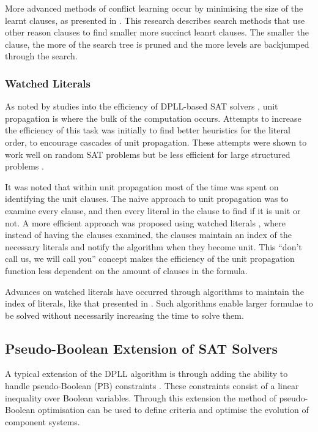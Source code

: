 More advanced methods of conflict learning occur by minimising the size of the learnt clauses, as presented in \citep{sorensson2009}.
This research describes search methods that use other reason clauses to find smaller more succinct leanrt clauses.
The smaller the clause, the more of the search tree is pruned and the more levels are backjumped through the search.

\subsubsection{Watched Literals}
As noted by studies into the efficiency of DPLL-based SAT solvers \citep{dixon2004automating}, unit propagation is where the bulk of the computation occurs.
Attempts to increase the efficiency of this task was initially to find better heuristics \citep{JamesMCrawford1996} for the literal order, to encourage cascades of unit propagation.
These attempts were shown to work well on random SAT problems but be less efficient for large structured problems \citep{dixon2004automating}.

It was noted that within unit propagation most of the time was spent on identifying the unit clauses.
The naive approach to unit propagation was to examine every clause, and then every literal in the clause to find if it is unit or not.
A more efficient approach was proposed using watched literals \citep{Madigan2001}, where instead of having the clauses examined, 
the clauses maintain an index of the necessary literals and notify the algorithm when they become unit.
This ``don't call us, we will call you'' concept makes the efficiency of the unit propagation function less dependent on the amount of clauses in the formula.

Advances on watched literals have occurred through algorithms to maintain the index of literals, like that presented in \citep{Moskewicz2001}.
Such algorithms enable larger formulae to be solved without necessarily increasing the time to solve them.

\subsection{Pseudo-Boolean Extension of SAT Solvers}
A typical extension of the DPLL algorithm is through adding the ability to handle pseudo-Boolean (PB) constraints \citep{dixon2004automating}.
These constraints consist of a linear inequality over Boolean variables.
Through this extension the method of pseudo-Boolean optimisation can be used to define criteria and optimise the evolution of component systems.

